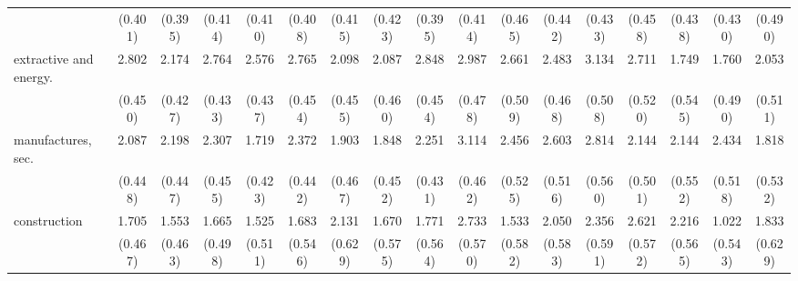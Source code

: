 {\begin{tabular}{l*{16}{c}}
                    &     (0.401)         &     (0.395)         &     (0.414)         &     (0.410)         &     (0.408)         &     (0.415)         &     (0.423)         &     (0.395)         &     (0.414)         &     (0.465)         &     (0.442)         &     (0.433)         &     (0.458)         &     (0.438)         &     (0.430)         &     (0.490)         \\
[1em]
extractive and energy.&       2.802\sym{***}&       2.174\sym{***}&       2.764\sym{***}&       2.576\sym{***}&       2.765\sym{***}&       2.098\sym{***}&       2.087\sym{***}&       2.848\sym{***}&       2.987\sym{***}&       2.661\sym{***}&       2.483\sym{***}&       3.134\sym{***}&       2.711\sym{***}&       1.749\sym{**} &       1.760\sym{***}&       2.053\sym{***}\\
                    &     (0.450)         &     (0.427)         &     (0.433)         &     (0.437)         &     (0.454)         &     (0.455)         &     (0.460)         &     (0.454)         &     (0.478)         &     (0.509)         &     (0.468)         &     (0.508)         &     (0.520)         &     (0.545)         &     (0.490)         &     (0.511)         \\
[1em]
manufactures, sec.  &       2.087\sym{***}&       2.198\sym{***}&       2.307\sym{***}&       1.719\sym{***}&       2.372\sym{***}&       1.903\sym{***}&       1.848\sym{***}&       2.251\sym{***}&       3.114\sym{***}&       2.456\sym{***}&       2.603\sym{***}&       2.814\sym{***}&       2.144\sym{***}&       2.144\sym{***}&       2.434\sym{***}&       1.818\sym{***}\\
                    &     (0.448)         &     (0.447)         &     (0.455)         &     (0.423)         &     (0.442)         &     (0.467)         &     (0.452)         &     (0.431)         &     (0.462)         &     (0.525)         &     (0.516)         &     (0.560)         &     (0.501)         &     (0.552)         &     (0.518)         &     (0.532)         \\
[1em]
construction        &       1.705\sym{***}&       1.553\sym{***}&       1.665\sym{***}&       1.525\sym{**} &       1.683\sym{**} &       2.131\sym{***}&       1.670\sym{**} &       1.771\sym{**} &       2.733\sym{***}&       1.533\sym{**} &       2.050\sym{***}&       2.356\sym{***}&       2.621\sym{***}&       2.216\sym{***}&       1.022         &       1.833\sym{**} \\
                    &     (0.467)         &     (0.463)         &     (0.498)         &     (0.511)         &     (0.546)         &     (0.629)         &     (0.575)         &     (0.564)         &     (0.570)         &     (0.582)         &     (0.583)         &     (0.591)         &     (0.572)         &     (0.565)         &     (0.543)         &     (0.629)         \\

\end{tabular}}
